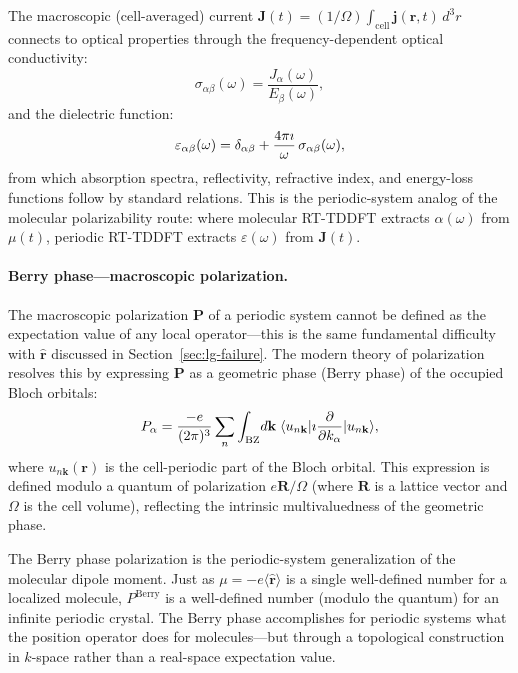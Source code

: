 The macroscopic (cell-averaged) current
$\mathbf{J}(t) = (1/\Omega)\int_\text{cell}\mathbf{j}(\mathbf{r},t)
\,d^3r$
connects to optical properties through the frequency-dependent
optical conductivity:
\begin{equation}
  \sigma_{\alpha\beta}(\omega)
  = \frac{J_\alpha(\omega)}{E_\beta(\omega)},
  \label{eq:conductivity}
\end{equation}
and the dielectric function:
\begin{equation}
  \varepsilon_{\alpha\beta}(\omega)
  = \delta_{\alpha\beta}
  + \frac{4\pi\imath}{\omega}\,\sigma_{\alpha\beta}(\omega),
  \label{eq:dielectric}
\end{equation}
from which absorption spectra, reflectivity, refractive index, and
energy-loss functions follow by standard relations.
This is the periodic-system analog of the molecular polarizability
route: where molecular RT-TDDFT extracts $\alpha(\omega)$ from
$\mu(t)$, periodic RT-TDDFT extracts $\varepsilon(\omega)$ from
$\mathbf{J}(t)$.

\paragraph{Berry phase---macroscopic polarization.}
The macroscopic polarization $\mathbf{P}$ of a periodic system
cannot be defined as the expectation value of any local
operator---this is the same fundamental difficulty with
$\hat{\mathbf{r}}$ discussed in Section~\ref{sec:lg-failure}.
The modern theory of polarization\cite{king-smith-vanderbilt-1993,%
resta-1994} resolves this by expressing $\mathbf{P}$ as a geometric
phase (Berry phase) of the occupied Bloch orbitals:
\begin{equation}
  P_\alpha
  = \frac{-e}{(2\pi)^3}\sum_n
    \int_\text{BZ}\!d\mathbf{k}\;
    \langle u_{n\mathbf{k}}|
    \imath\frac{\partial}{\partial k_\alpha}
    |u_{n\mathbf{k}}\rangle,
  \label{eq:berry-phase-P}
\end{equation}
where $u_{n\mathbf{k}}(\mathbf{r})$ is the cell-periodic part of the
Bloch orbital.
This expression is defined modulo a quantum of polarization
$e\mathbf{R}/\Omega$ (where $\mathbf{R}$ is a lattice vector and
$\Omega$ is the cell volume), reflecting the intrinsic
multivaluedness of the geometric phase.

The Berry phase polarization is the periodic-system generalization
of the molecular dipole moment.
Just as $\mu = -e\langle\hat{\mathbf{r}}\rangle$ is a single
well-defined number for a localized molecule, $P^\text{Berry}$ is a
well-defined number (modulo the quantum) for an infinite periodic
crystal.
The Berry phase accomplishes for periodic systems what the position
operator does for molecules---but through a topological construction
in $k$-space rather than a real-space expectation value.

